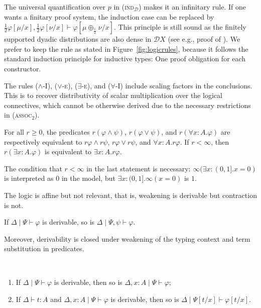 \documentclass[a4paper,UKenglish,cleveref, autoref, thm-restate]{lipics-v2021}
\newcommand{\D}{\mathcal{D}}
\newcommand{\ts}{\vdash}
\newcommand{\hastype}[3]{#1\ts #2 : #3}
\newcommand{\TD}{\mathcal{D}}
\newcommand{\logicJ}[3][\Delta]{#1 \mid #2 \vdash #3}
\newcommand{\peq}{=}
\begin{document}
\begin{remark} \label{rem:finiteTD-Induction}
The universal quantification over $p$ in \textsc{(ind${}_\TD$)} makes it an infinitary rule. If one wants
a finitary proof system, the induction case can be replaced by
%
$\frac{1}{2} \varphi[\mu/x], \frac{1}{2}\varphi[\nu/x] \vdash \varphi[\mu \oplus_{\frac12} \nu/x]$. 
This principle is still sound as the finitely supported dyadic distributions are also dense in $\D X$ 
(see e.g., proof of \cite[Theorem 21]{BreugelHMW07}). We prefer to keep the rule as stated in Figure~\ref{fig:logicrules},
because it follows the standard induction principle for inductive types: One proof obligation for each constructor. 
\end{remark}

The rules (\textsc{$\wedge$-I}), (\textsc{$\vee$-e}), (\textsc{$\exists$-e}), and (\textsc{$\forall$-I}) include scaling factors in the conclusions. This is to recover distributivity of scalar multiplication over the logical connectives, which cannot be otherwise derived due to the necessary restrictions in (\textsc{assoc${}_2$}).

\begin{lemma} \label{lem:r:exists}
 For all $r \geq 0$, the predicates $r(\varphi \wedge \psi)$, $r(\varphi \vee \psi)$, and $r(\forall x : A. \varphi)$ are respectively equivalent to $r\varphi \wedge r\psi$, $r\varphi \vee r\psi$, and $\forall x : A. r\varphi$.  
 If $r < \infty$, then $r(\exists x:A . \varphi)$ is equivalent to $\exists x : A. r\varphi$.
\end{lemma}

The condition that $r < \infty$ in the last statement is necessary: $\infty (\exists x : (0,1] . x \peq 0)$ is interpreted as $0$ in the model, but $\exists x : (0,1] . \infty (x \peq 0)$ is $1$.

The logic is affine but not relevant, that is, weakening is derivable but contraction is not. 
\begin{lemma} \label{lem:logic:weak}
 If $\logicJ[\Delta]{\Psi}{\varphi}$ is derivable, so is $\logicJ[\Delta]{\Psi, \psi}{\varphi}$.
\end{lemma}

Moreover, derivability is closed under weakening of the typing context and term substitution in predicates.
\begin{lemma} \label{lem:weak} \
\begin{enumerate}
\item  If $\logicJ[\Delta]{\Psi}{\varphi}$ is derivable, then so is $\logicJ[\Delta, x:A]{\Psi}{\varphi}$;
\item If $\hastype\Delta tA$ and $\logicJ[\Delta, x:A]{\Psi}{\varphi}$ is derivable, then so is $\logicJ[\Delta]{\Psi[t/x]}{\varphi[t/x]}$.
\end{enumerate}
\end{lemma}
\end{document}
